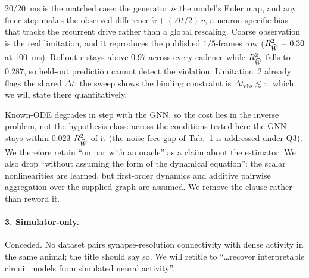
$20/20$~ms is the matched case: the generator \emph{is} the model's Euler map,
and any finer step makes the observed difference $\dot v + (\Delta t/2)\,\ddot v$,
a neuron-specific bias that tracks the recurrent drive rather than a global
rescaling. Coarse observation is the real limitation, and it reproduces the
published $1/5$-frames row ($R^2_{\widehat W} = 0.30$ at $100$~ms). Rollout $r$ stays above
$0.97$ across every cadence while $R^2_{\widehat W}$ falls to $0.287$, so held-out prediction
cannot detect the violation. Limitation~2 already flags the shared $\Delta t$;
the sweep shows the binding constraint is
$\Delta t_{\mathrm{obs}} \lesssim \tau$, which we will state there quantitatively.

Known-ODE degrades in step with the GNN, so the cost lies in the
inverse problem, not the hypothesis class: across the conditions tested here the
GNN stays within $0.023$ $R^2_{\widehat W}$ of it (the noise-free gap of Tab.~1 is addressed
under Q3). We therefore retain ``on par with an oracle'' as a claim about the
estimator. We also drop ``without assuming the form of the dynamical equation'':
the scalar nonlinearities are learned, but first-order dynamics and additive
pairwise aggregation over the supplied graph are assumed. We remove the clause
rather than reword it.

\paragraph{3. Simulator-only.}
Conceded. No dataset pairs synapse-resolution
connectivity with dense activity in the same animal; the title should say so.
We will retitle to ``\dots recover interpretable circuit models from simulated
neural activity''.
